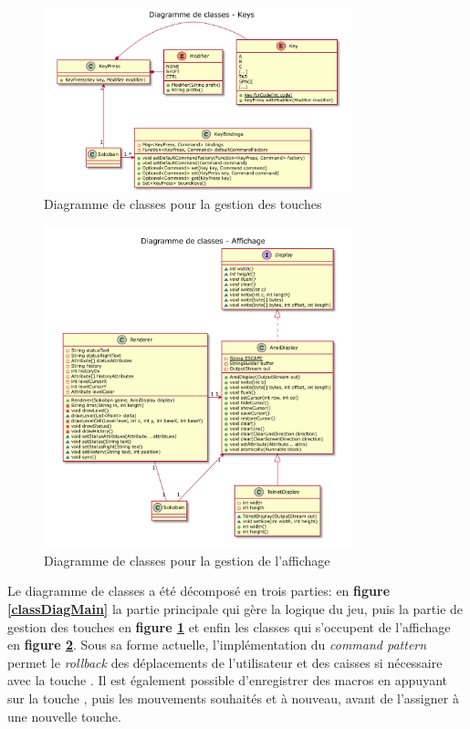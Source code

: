 \documentclass[french]{article}
\begin{document}
	\begin{figure}[H]
		\centering
		\includegraphics[width=0.8\textwidth]{keys}
		\caption{Diagramme de classes pour la gestion des touches}
		\label{classDiagKey}
	\end{figure}
	
	\begin{figure}[H]
		\centering
		\includegraphics[width=0.8\textwidth]{affichage}
		\caption{Diagramme de classes pour la gestion de l'affichage}
		\label{classDiagDisplay}
	\end{figure}
	
	Le diagramme de classes a été décomposé en trois parties: en \textbf{figure \ref{classDiagMain}} la partie principale qui gère la logique du jeu, puis la partie de gestion des touches en \textbf{figure \ref{classDiagKey}} et enfin les classes qui s'occupent de l'affichage en \textbf{figure \ref{classDiagDisplay}}. Sous sa forme actuelle, l'implémentation du \textit{command pattern} permet le \textit{rollback} des déplacements de l'utilisateur et des caisses si nécessaire avec la touche . Il est également possible d'enregistrer des macros en appuyant sur la touche , puis les mouvements souhaités et  à nouveau, avant de l'assigner à une nouvelle touche.
	
\end{document}
